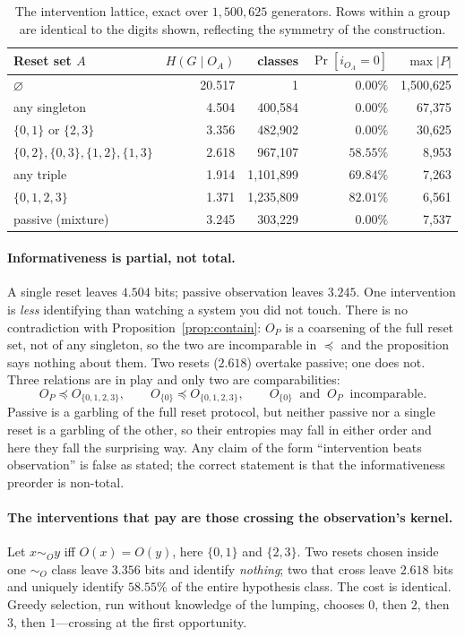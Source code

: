 \documentclass[11pt]{article}
\begin{document}
\begin{table}[h]
\centering
\begin{tabular}{lrrrr}
\toprule
Reset set $A$ & $H(G \mid O_A)$ & classes & $\Pr[i_{O_A}=0]$ & $\max |P|$ \\
\midrule
$\varnothing$ & 20.517 & 1 & $0.00\%$ & 1{,}500{,}625 \\
any singleton & 4.504 & 400{,}584 & $0.00\%$ & 67{,}375 \\
$\{0,1\}$ or $\{2,3\}$ & 3.356 & 482{,}902 & $0.00\%$ & 30{,}625 \\
$\{0,2\},\{0,3\},\{1,2\},\{1,3\}$ & 2.618 & 967{,}107 & $58.55\%$ & 8{,}953 \\
any triple & 1.914 & 1{,}101{,}899 & $69.84\%$ & 7{,}263 \\
$\{0,1,2,3\}$ & 1.371 & 1{,}235{,}809 & $82.01\%$ & 6{,}561 \\
\midrule
passive (mixture) & 3.245 & 303{,}229 & $0.00\%$ & 7{,}537 \\
\bottomrule
\end{tabular}
\caption{The intervention lattice, exact over $1{,}500{,}625$ generators. Rows within a
group are identical to the digits shown, reflecting the symmetry of the construction.}
\label{tab:lattice}
\end{table}

\paragraph{Informativeness is partial, not total.}
A single reset leaves $4.504$ bits; passive observation leaves $3.245$. One intervention
is \emph{less} identifying than watching a system you did not touch. There is no
contradiction with Proposition~\ref{prop:contain}: $O_P$ is a coarsening of the full reset
set, not of any singleton, so the two are incomparable in $\preceq$ and the proposition
says nothing about them. Two resets ($2.618$) overtake passive; one does not. Three relations are in play and
only two are comparabilities:
\[
  O_P \preceq O_{\{0,1,2,3\}}, \qquad
  O_{\{0\}} \preceq O_{\{0,1,2,3\}}, \qquad
  O_{\{0\}} \;\;\text{and}\;\; O_P \;\;\text{incomparable.}
\]
Passive is a garbling of the full reset protocol, but neither passive nor a single reset is
a garbling of the other, so their entropies may fall in either order and here they fall the
surprising way. Any claim of the form ``intervention beats observation'' is false as
stated; the correct statement is that the informativeness preorder is non-total.

\paragraph{The interventions that pay are those crossing the observation's kernel.}
Let $x \sim_O y$ iff $O(x) = O(y)$, here $\{0,1\}$ and $\{2,3\}$. Two resets chosen inside
one $\sim_O$ class leave $3.356$ bits and identify \emph{nothing}; two that cross leave
$2.618$ bits and uniquely identify $58.55\%$ of the entire hypothesis class. The cost is
identical. Greedy selection, run without knowledge of the lumping, chooses $0$, then $2$,
then $3$, then $1$---crossing at the first opportunity.
\end{document}
